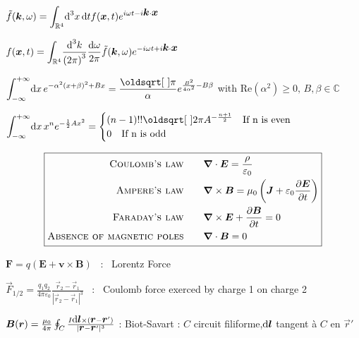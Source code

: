 $\tilde{f}(\mbox{\boldmath$k$},\omega) = \displaystyle{\int_{\mathbb{R}^4}} \textrm{d} ^3x\, \textrm{d} t f(\mbox{\boldmath$x$},t) e^{i\omega t - i \mbox{\boldmath$k$}\cdot\mbox{\boldmath$x$}}$  

$f(\mbox{\boldmath$x$}, t) = \displaystyle{\int_{\mathbb{R}^4}} \dfrac{\textrm{d} ^3k}{\left(2\pi\right)^3} \dfrac{\textrm{d} \omega}{2\pi} \tilde{f}(\mbox{\boldmath$k$},\omega)e^{-i\omega t + i \mbox{\boldmath$k$}\cdot\mbox{\boldmath$x$}}$


\squishlist
\item $\displaystyle{\int_{-\infty}^{+\infty}} \ud x \, e^{-\alpha^2(x+\beta)^2 + Bx} = \dfrac{\sqrt{\pi}}{\alpha} \displaystyle{e^{\frac{B^2}{4\alpha^2}-B\beta}} $ with Re$(\alpha^2) \ge 0, \, B, \beta \in \mathbb{C}$ 

\item $      \displaystyle{\int_{-\infty}^{+\infty}} \ud x \, x^n e^{-\frac{1}{2}Ax^2} = 
\begin{cases}
(n-1)!!\sqrt{2\pi}A^{-\frac{n+1}{2}} \quad \text{If n is even} \\
0 \quad \text{If n is odd}
\end{cases}
$
\squishend
{}

$$\boxed{\begin{split}
\textsc{Coulomb's law} \qquad &\boldsymbol{\nabla} \cdot \boldsymbol{E} = \frac{\rho}{\varepsilon_0}\\
\textsc{Ampere's law} \qquad &\boldsymbol{\nabla} \times \boldsymbol{B} = \mu_0 \left(\boldsymbol{J} + \varepsilon_0\frac{\partial \boldsymbol{E}}{\partial t}\right)\\
\textsc{Faraday's law} \qquad &\boldsymbol{\nabla} \times \boldsymbol{E} + \frac{\partial \boldsymbol{B}}{\partial t} = 0\\
\textsc{Absence of magnetic poles} \qquad &\boldsymbol{\nabla} \cdot \boldsymbol{B} = 0
\end{split}}$$
\vspace{1cm}
\columnbreak


\squishlist
\item $ \boldsymbol{F} = q(\boldsymbol{E}+\boldsymbol{v} \times \boldsymbol{B}) $ \, :  \, Lorentz Force

\item $ \vec{F}_{1/2} = \frac{q_1q_2}{4\pi\varepsilon_0} \frac{\vec{r}_2 - \vec{r}_1}{|\vec{r}_2 - \vec{r}_1|^3} $ \, : \, Coulomb force exerced by charge 1 on charge 2
\item $\mbox{\boldmath$B$}(\mbox{\boldmath$r$}) = \frac{\mu_0}{4\pi} \oint_{C} \frac{I \mbox{\boldmath$\textrm{d} l$} \times (\mbox{\boldmath$r$} - \mbox{\boldmath$r$}')}{|\mbox{\boldmath$r$}-\mbox{\boldmath$r$}'|^3} $  :  Biot-Savart : $C$ circuit filiforme,$\mbox{\boldmath$\textrm{d} l$}$ tangent à $C$ en  $\vec{r}'$

